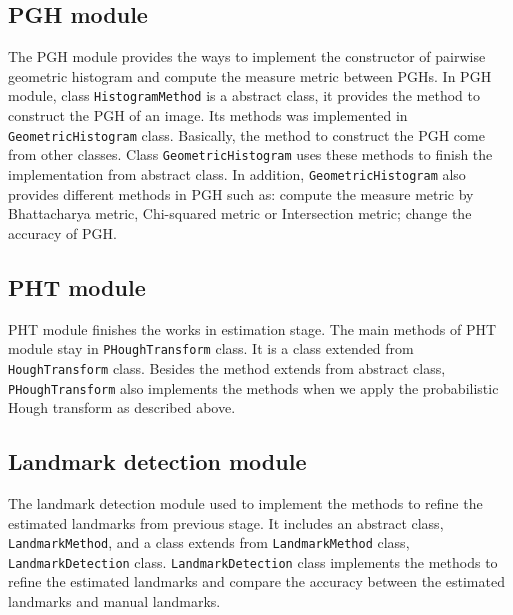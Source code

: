 \subsection{PGH module}
The PGH module provides the ways to implement the constructor of pairwise geometric histogram and compute the measure metric between PGHs. In PGH module, class \texttt{HistogramMethod} is a abstract class, it provides the method to construct the PGH of an image. Its methods was implemented in \texttt{GeometricHistogram} class. Basically, the method to construct the PGH come from other classes. Class \texttt{GeometricHistogram} uses these methods to finish the implementation from abstract class. In addition, \texttt{GeometricHistogram} also provides different methods in PGH such as: compute the measure metric by Bhattacharya metric, Chi-squared metric or Intersection metric; change the accuracy of PGH.
\subsection{PHT module}
PHT module finishes the works in estimation stage. The main methods of PHT module stay in \texttt{PHoughTransform} class. It is a class extended from \texttt{HoughTransform} class. Besides the method extends from abstract class, \texttt{PHoughTransform} also implements the methods when we apply the probabilistic Hough transform as described above.
\subsection{Landmark detection module}
The landmark detection module used to implement the methods to refine the estimated landmarks from previous stage. It includes an abstract class, \texttt{LandmarkMethod}, and a class extends from \texttt{LandmarkMethod} class, \texttt{LandmarkDetection} class. \texttt{LandmarkDetection} class implements the methods to refine the estimated landmarks and compare the accuracy between the estimated landmarks and manual landmarks.
